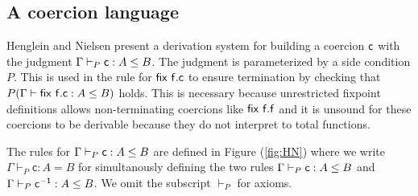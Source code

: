 \subsection{A coercion language} 


Henglein and Nielsen \cite{HN11} present a derivation system for building a coercion $\mathsf{c}$ with the judgment $\Gamma \vdash_P \mathsf{c} : A \leq B$. The judgment is parameterized by a side condition $P$. 
This is used in the rule for $\mathsf{fix}~\mathsf{f. c}$ to ensure termination by checking that $P(\Gamma \vdash \mathsf{\mathsf{fix}~ \mathsf{f.c}} : A \leq B)$ holds. This is necessary because unrestricted fixpoint definitions allows non-terminating coercions like $\mathsf{fix}~ \mathsf{f}.\mathsf{f}$ and it is unsound for these coercions to be derivable because they do not interpret to total functions. 

The rules for $\Gamma \vdash_P \mathsf{c} : A \leq B$ are defined in Figure (\ref{fig:HN}) where we write $\Gamma \vdash_P \mathsf{c}: {A} = {B}$ for simultanously defining the two rules  $\Gamma \vdash_P \mathsf{c} : A \leq B$ and  $\Gamma \vdash_P \mathsf{c^{-1}} : A \leq B$. We omit the subscript $\vdash_P$ for axioms. 

